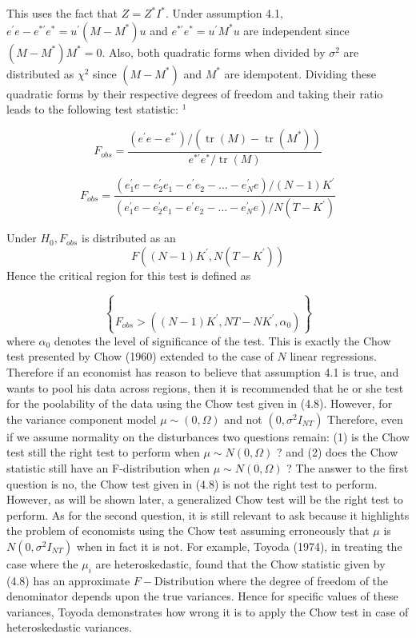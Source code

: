 \documentclass[
]{book}
\begin{document}
This uses the fact that \(Z=Z^{*} I^{*} .\) Under assumption 4.1, \(e^{\prime} e-e^{* \prime} e^{*}=u^{\prime}\left(M-M^{*}\right) u\) and \(e^{* \prime} e^{*}=u^{\prime} M^{*} u\) are independent since \(\left(M-M^{*}\right) M^{*}=0 .\) Also, both quadratic forms when divided by \(\sigma^{2}\) are distributed as \(\chi^{2}\) since \(\left(M-M^{*}\right)\) and \(M^{*}\) are idempotent. Dividing these quadratic forms by their respective degrees of freedom and taking their ratio leads to the following test statistic: \({ }^{1}\)

\[F_{obs}=\frac{\left(e^{\prime}e-e^{* \prime} \right) / \left( \operatorname{tr}\left(M\right)-\operatorname{tr}\left(M^*\right) \right)}
{e^{* \prime}e^* / \operatorname{tr}\left(M\right) }  \]

\begin{equation}
F_{obs}=\frac{\left(e_1^{\prime}e-e_2^{\prime}e_1 -e^{\prime}e_2 -\ldots -e_N^{\prime}e \right)/ \left(N-1 \right) K^{\prime}  }
{\left(e_1^{\prime}e-e_2^{\prime}e_1 -e^{\prime}e_2 -\ldots -e_N^{\prime}e \right)/ N \left(T-K^{\prime} \right) } 
\end{equation}

Under \(H_0,F_{obs}\) is distributed as an \[F \left(\left(N-1 \right)K^{\prime}, N\left(T-K^{\prime}\right)\right) \] Hence the critical region for this test is defined as

\[\brace  F_{obs}> \left(\left(N-1 \right)K^{\prime}, NT-NK^{\prime} ,\alpha_0 \right)      \]
where \(\alpha_0\) denotes the level of significance of the test. This is exactly the Chow test presented by Chow (1960) extended to the case of \(N\) linear regressions. Therefore if an economist has reason to believe that assumption 4.1 is true, and wants to pool his data across regions, then it is recommended that he or she test for the poolability of the data using the Chow test given in (4.8). However, for the variance component model \(\mu \sim \left(0,\Omega \right)\) and not \(\left(0,\sigma^2 I_{NT} \right)\) Therefore, even if we assume normality on the disturbances two questions remain: (1) is the Chow test still the right test to perform when \(\mu \sim N\left(0,\Omega \right)\) ? and (2) does the Chow statistic still have an
F-distribution when \(\mu \sim N\left(0,\Omega \right)\) ? The answer to the first question is no, the Chow test given
in (4.8) is not the right test to perform. However, as will be shown later, a generalized Chow
test will be the right test to perform. As for the second question, it is still relevant to ask because
it highlights the problem of economists using the Chow test assuming erroneously that \(\mu\) is \(N\left(0,\sigma^2 I_{NT} \right)\) when in fact it is not. For example, Toyoda (1974), in treating the case where
the \(\mu_i\) are heteroskedastic, found that the Chow statistic given by (4.8) has an approximate \(F-\text{Distribution}\) where the degree of freedom of the denominator depends upon the true variances.
Hence for specific values of these variances, Toyoda demonstrates how wrong it is to apply the Chow test in case of heteroskedastic variances.
\end{document}

